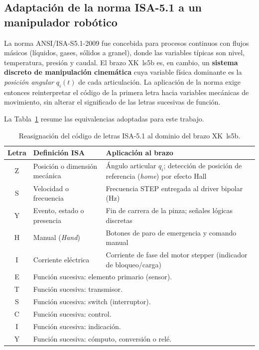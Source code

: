 \documentclass[11pt]{article}
\begin{document}
\subsection{Adaptación de la norma ISA-5.1 a un manipulador robótico}
\label{subsec:isa_adaptacion}

La norma ANSI/ISA-S5.1-2009 fue concebida para procesos continuos con flujos másicos (líquidos, gases, sólidos a granel), donde las variables típicas son nivel, temperatura, presión y caudal. El brazo XK~ls5b es, en cambio, un \textbf{sistema discreto de manipulación cinemática} cuya variable física dominante es la \emph{posición angular} $q_i(t)$ de cada articulación. La aplicación de la norma exige entonces reinterpretar el código de la primera letra hacia variables mecánicas de movimiento, sin alterar el significado de las letras sucesivas de función.

La Tabla~\ref{tab:letras_isa} resume las equivalencias adoptadas para este trabajo.

\begin{table}[H]
	\centering\small
	\caption{Reasignación del código de letras ISA-5.1 al dominio del brazo XK~ls5b.}
	\label{tab:letras_isa}
	\begin{tabular}{@{}c l p{6.2cm}@{}}
		\toprule
		\textbf{Letra} & \textbf{Definición ISA} & \textbf{Aplicación al brazo} \\
		\midrule
		Z & Posición o dimensión mecánica & Ángulo articular $q_i$; detección de posición de referencia (\emph{home}) por efecto Hall \\
		S & Velocidad o frecuencia         & Frecuencia STEP entregada al driver bipolar (Hz) \\
		Y & Evento, estado o presencia    & Fin de carrera de la pinza; señales lógicas discretas \\
		H & Manual (\emph{Hand})          & Botones de paro de emergencia y comando manual \\
		I & Corriente eléctrica           & Corriente de fase del motor stepper (indicador de bloqueo/carga) \\
		\midrule
		E & \multicolumn{2}{l}{Función sucesiva: elemento primario (sensor).} \\
		T & \multicolumn{2}{l}{Función sucesiva: transmisor.} \\
		S & \multicolumn{2}{l}{Función sucesiva: switch (interruptor).} \\
		C & \multicolumn{2}{l}{Función sucesiva: control.} \\
		I & \multicolumn{2}{l}{Función sucesiva: indicación.} \\
		Y & \multicolumn{2}{l}{Función sucesiva: cómputo, conversión o relé.} \\
		\bottomrule
	\end{tabular}
\end{table}
\end{document}
